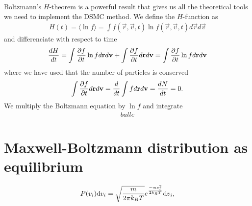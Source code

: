 Boltzmann's $H$-theorem is a powerful result that gives us all the theoretical tools we need to implement the DSMC method. We define the $H$-function as
\begin{align}
	H(t) = \langle \ln f \rangle = \int f(\vec r, \vec v, t)\ln f(\vec r, \vec v, t)d\vec r d\vec v
\end{align}
and differenciate with respect to time
\begin{align}
	\frac{dH}{dt} = \int \frac{\partial f}{\partial t}\ln f d\mathbf r d\mathbf v + \int \frac{\partial f}{\partial t} d\mathbf r d\mathbf v = \int \frac{\partial f}{\partial t}\ln f d\mathbf r d\mathbf v
\end{align}
where we have used that the number of particles is conserved
\begin{align}
	\int \frac{\partial f}{\partial t}d\mathbf r d\mathbf v = \frac{d}{dt} \int fd\mathbf r d\mathbf v = \frac{dN}{dt} = 0.
\end{align}
We multiply the Boltzmann equation by $\ln f$ and integrate
\begin{align}
	balle
\end{align}

\section{Maxwell-Boltzmann distribution as equilibrium}
\label{sec:maxwell_boltzmann_distribution}
\begin{align}
	\label{eq:maxwell_boltzmann_distribution}
	P(v_i)\mathrm{d}v_i = \sqrt\frac{m}{ 2\pi k_BT}e^\frac{-mv_i^2}{ 2k_BT}\mathrm{d}v_i,
\end{align}
